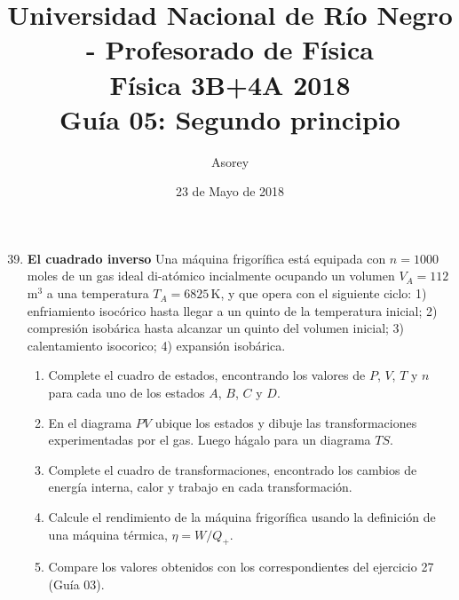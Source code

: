 \documentclass[a4paper,12pt]{article}
\begin{document}
\title{
{\normalsize{Universidad Nacional de Río Negro - Profesorado de Física}}\\
Física 3B+4A  2018 \\ Guía 05: Segundo principio
}
\author{Asorey}
\date{23 de Mayo de 2018} 
\maketitle

\begin{enumerate}
	\setcounter{enumi}{38}      %
    \item {\bf{El cuadrado inverso}}
		Una máquina frigorífica está equipada con $n=1000$\,moles de un gas
		ideal di-atómico incialmente ocupando un volumen $V_A=112$\,m$^3$ a una
		temperatura $T_A=6825$\,K, y que opera con el siguiente ciclo: 1)
		enfriamiento isocórico hasta llegar a un quinto de la temperatura
		inicial; 2) compresión isobárica hasta alcanzar un quinto del volumen
		inicial; 3) calentamiento isocorico; 4) expansión isobárica.
        \begin{enumerate}
            \item Complete el cuadro de estados, encontrando los valores de
                $P$, $V$, $T$ y $n$ para cada uno de los estados $A$, $B$, $C$
                y $D$.
            \item En el diagrama $PV$ ubique los estados y dibuje las
				transformaciones experimentadas por el gas. Luego hágalo para
				un diagrama $TS$.
            \item Complete el cuadro de transformaciones, encontrado los
                cambios de energía interna, calor y trabajo en cada
                transformación.
			\item Calcule el rendimiento de la máquina frigorífica usando la
				definición de una máquina térmica, $\eta=W/Q_{+}$.
			\item Compare los valores obtenidos con los correspondientes del
				ejercicio 27 (Guía 03).
        \end{enumerate}


\end{enumerate}
\end{document}
